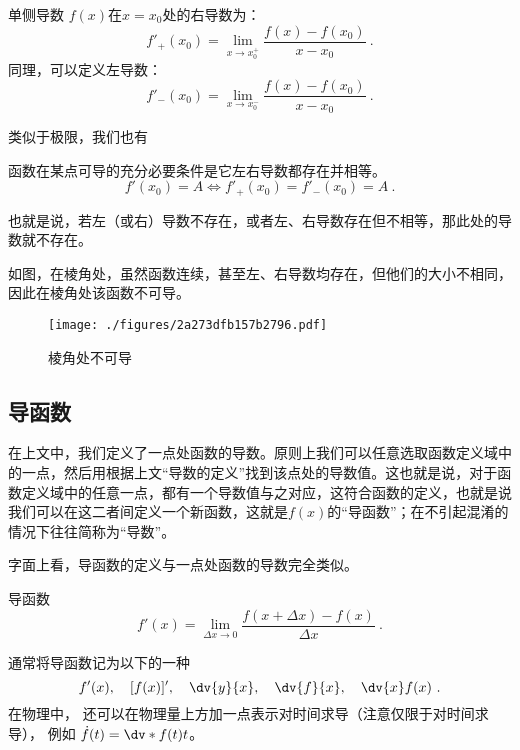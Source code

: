 \begin{definition}{单侧导数}\label{def_Der_1}
$f(x)$在$x=x_0$处的右导数为：
\begin{equation}
f'_+(x_0) = \lim_{x\to x_0^+} \frac{f(x)-f(x_0)}{x-x_0}~.
\end{equation}
同理，可以定义左导数：
\begin{equation}
f'_-(x_0) = \lim_{x\to x_0^-} \frac{f(x)-f(x_0)}{x-x_0}~.
\end{equation}
\end{definition}

类似于极限，我们也有
\begin{theorem}{}
函数在某点可导的充分必要条件是它左右导数都存在并相等。
$$f'(x_0)=A\Longleftrightarrow f'_+(x_0)=f'_-(x_0)=A~.$$

也就是说，若左（或右）导数不存在，或者左、右导数存在但不相等，那此处的导数就不存在。
\end{theorem}

\begin{example}{}
如图，在棱角处，虽然函数连续，甚至左、右导数均存在，但他们的大小不相同，因此在棱角处该函数不可导。
\begin{figure}[ht]
\centering
\texttt{[image: ./figures/2a273dfb157b2796.pdf]}
\caption{棱角处不可导} \label{fig_Der_21}
\end{figure}

\end{example}
\subsection{导函数}
在上文中，我们定义了一点处函数的导数。原则上我们可以任意选取函数定义域中的一点，然后用根据上文“导数的定义”找到该点处的导数值。这也就是说，对于函数定义域中的任意一点，都有一个导数值与之对应，这符合函数的定义，也就是说我们可以在这二者间定义一个新函数，这就是$f(x)$的“导函数”；在不引起混淆的情况下往往简称为“导数”。

字面上看，导函数的定义与一点处函数的导数完全类似。
\begin{definition}{导函数}
\begin{equation}
f'(x)=\lim_{\Delta x \to 0}\frac{f(x+\Delta x)-f(x)}{\Delta x}~.
\end{equation}
\end{definition}

通常将导函数记为以下的一种%
\begin{equation}\label{eq_Der_1}
f'(x),\quad [f(x)]',\quad \dv{y}{x},\quad \dv{f}{x},\quad \dv{x}f(x)~.
\end{equation}
在物理中， 还可以在物理量上方加一点表示对时间求导（注意仅限于对时间求导）， 例如 $\dot f(t) = \dv*{f(t)}{t}$。

